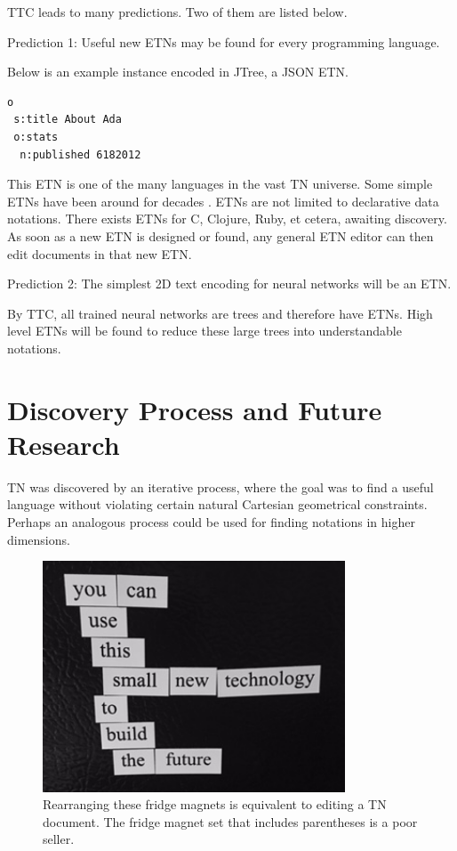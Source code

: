 \documentclass[journal]{IEEEtran}
\begin{document}
TTC leads to many predictions. Two of them are listed below.

Prediction 1: Useful new ETNs may be found for every programming language.

Below is an example instance encoded in JTree, a JSON ETN.

\begin{lstlisting}
o
 s:title About Ada
 o:stats
  n:published 6182012
\end{lstlisting}

This ETN is one of the many languages in the vast TN universe. Some simple ETNs have been around for decades \cite{Roughan}. ETNs are not limited to declarative data notations. There exists ETNs for C, Clojure, Ruby, et cetera, awaiting discovery. As soon as a new ETN is designed or found, any general ETN editor can then edit documents in that new ETN.

Prediction 2: The simplest 2D text encoding for neural networks will be an ETN.

By TTC,  all trained neural networks are trees and therefore have ETNs. High level ETNs will be found to reduce these large trees into understandable notations.

\section{Discovery Process and Future Research}

TN was discovered by an iterative process, where the goal was to find a useful language without violating certain natural Cartesian geometrical constraints. Perhaps an analogous process could be used for finding notations in higher dimensions.

\begin{figure}[ht!]
\centering
\includegraphics[width=90mm]{tree.jpg}
\caption{Rearranging these fridge magnets is equivalent to editing a TN document. The fridge magnet set that includes parentheses is a poor seller.}
\end{figure}
\end{document}
